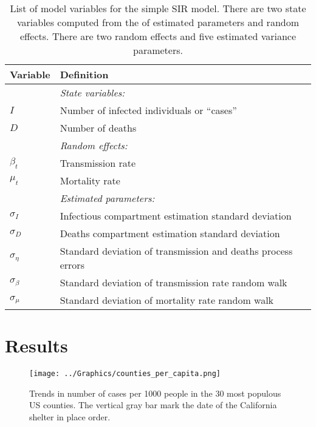 \documentclass[12pt,letterpaper]{article}
\begin{document}
\begin{table}
\caption{List of model variables for the simple SIR model.
There are two state variables computed from the of estimated
parameters and random effects.
There are two random effects and five estimated variance parameters.
}
\label{tab:allvars1}
\begin{center}
\begin{tabular}{ll}
\hline
Variable & Definition\\
\hline
\hline
       & {\it State variables:}\\
$I$      & Number of infected individuals or ``cases''\\
$D$      & Number of deaths\\
       & {\it Random effects:}\\
$\beta_t$ & Transmission rate\\
$\mu_t$   & Mortality rate\\
       & {\it Estimated parameters:}\\
$\sigma_I$ & Infectious compartment estimation standard deviation\\
$\sigma_D$ & Deaths compartment estimation standard deviation\\
$\sigma_\eta$ & Standard deviation of transmission and deaths process errors\\
$\sigma_\beta$ & Standard deviation of transmission rate random walk\\
$\sigma_\mu$ & Standard deviation of mortality rate random walk\\
\hline
\end{tabular}
\end{center}
\end{table}

\clearpage
\section*{Results}

\begin{figure}
\begin{center}
\texttt{[image: ../Graphics/counties\_per\_capita.png]}
\end{center}
\caption{\label{fig:percap}
Trends in number of cases per 1000 people in the 30 most populous US
counties.
The vertical gray bar mark the date of the California shelter in place order.
}
\end{figure}

\end{document}
